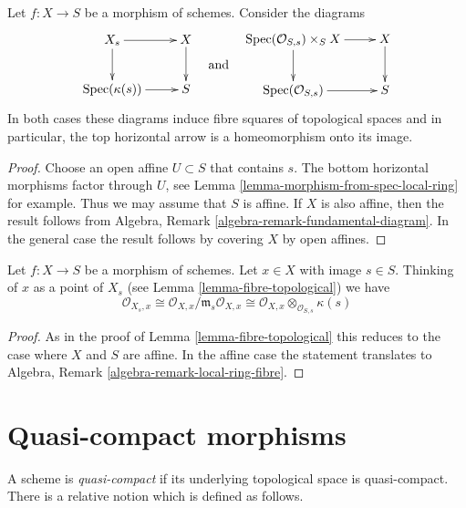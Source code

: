 \begin{lemma}
\label{lemma-fibre-topological}
Let $f : X \to S$ be a morphism of schemes.
Consider the diagrams
$$
\vcenter{
\xymatrix{
X_s \ar[r] \ar[d] & X \ar[d] \\
\Spec(\kappa(s)) \ar[r] & S
}
}
\quad\text{and}\quad
\vcenter{
\xymatrix{
\Spec(\mathcal{O}_{S, s}) \times_S X \ar[r] \ar[d] & X \ar[d] \\
\Spec(\mathcal{O}_{S, s}) \ar[r] & S
}
}
$$
In both cases these diagrams induce fibre squares of topological
spaces and in particular, the top horizontal arrow is a homeomorphism
onto its image.
\end{lemma}

\begin{proof}
Choose an open affine $U \subset S$ that contains $s$.
The bottom horizontal morphisms factor through $U$, see
Lemma \ref{lemma-morphism-from-spec-local-ring} for example.
Thus we may assume that $S$ is affine. If $X$ is also affine, then
the result follows from
Algebra, Remark \ref{algebra-remark-fundamental-diagram}.
In the general case the result follows by covering $X$ by open affines.
\end{proof}

\begin{lemma}
\label{lemma-local-ring-fibre}
Let $f : X \to S$ be a morphism of schemes. Let $x \in X$
with image $s \in S$. Thinking of $x$ as a point of $X_s$
(see Lemma \ref{lemma-fibre-topological}) we have
$$
\mathcal{O}_{X_s, x} \cong
\mathcal{O}_{X, x}/\mathfrak m_s\mathcal{O}_{X, x} \cong
\mathcal{O}_{X, x} \otimes_{\mathcal{O}_{S, s}} \kappa(s)
$$
\end{lemma}

\begin{proof}
As in the proof of Lemma \ref{lemma-fibre-topological} this reduces
to the case where $X$ and $S$ are affine. In the affine case the statement
translates to Algebra, Remark \ref{algebra-remark-local-ring-fibre}.
\end{proof}







\section{Quasi-compact morphisms}
\label{section-quasi-compact}

\noindent
A scheme is {\it quasi-compact} if its underlying topological space is
quasi-compact. There is a relative notion which is defined as follows.

